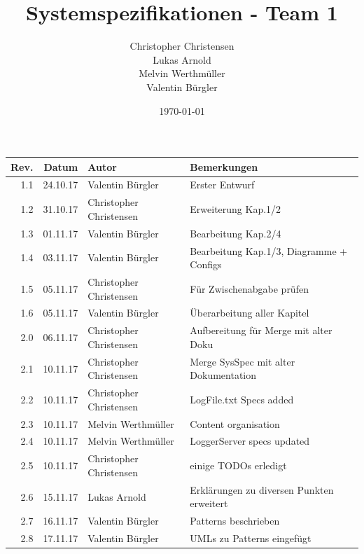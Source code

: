 \documentclass[12pt,a4paper,twosided]{scrartcl}
\title{Systemspezifikationen - Team 1}
\author{Christopher Christensen\\Lukas Arnold\\Melvin Werthmüller\\Valentin Bürgler}
\date{\today}
\begin{document}
	
\thispagestyle{plain}
\maketitle

\begin{center}
	\begin{tabularx}{\textwidth}{|r|r|l|X|}
		\hline
		\textbf{Rev.} & \textbf{Datum} & \textbf{Autor} & \textbf{Bemerkungen} 					   \\ \hline
		1.1  & 24.10.17 & Valentin Bürgler        & Erster Entwurf                                 \\ \hline
		1.2  & 31.10.17 & Christopher Christensen & Erweiterung Kap.1/2                            \\ \hline
		1.3  & 01.11.17 & Valentin Bürgler        & Bearbeitung Kap.2/4                            \\ \hline
		1.4  & 03.11.17 & Valentin Bürgler        & Bearbeitung Kap.1/3, Diagramme + Configs \\ \hline
		1.5  & 05.11.17 & Christopher Christensen & Für Zwischenabgabe prüfen                      \\ \hline
		1.6  & 05.11.17 & Valentin Bürgler        & Überarbeitung aller Kapitel                    \\ \hline
		2.0  & 06.11.17 & Christopher Christensen & Aufbereitung für Merge mit alter Doku \\ \hline
		2.1  & 10.11.17 & Christopher Christensen & Merge SysSpec mit alter Dokumentation          \\ \hline
		2.2  & 10.11.17 & Christopher Christensen & LogFile.txt Specs added                        \\ \hline
		2.3  & 10.11.17 & Melvin Werthmüller      & Content organisation                           \\ \hline
		2.4  & 10.11.17 & Melvin Werthmüller      & LoggerServer specs updated                     \\ \hline
		2.5  & 10.11.17 & Christopher Christensen & einige TODOs erledigt                          \\ \hline
		2.6  & 15.11.17 & Lukas Arnold            & Erklärungen zu diversen Punkten erweitert      \\ \hline
		2.7  & 16.11.17 & Valentin Bürgler        & Patterns beschrieben                           \\ \hline
		2.8  & 17.11.17 & Valentin Bürgler        & UMLs zu Patterns eingefügt                     \\ \hline

\end{tabularx}
\end{center}
\end{document}
